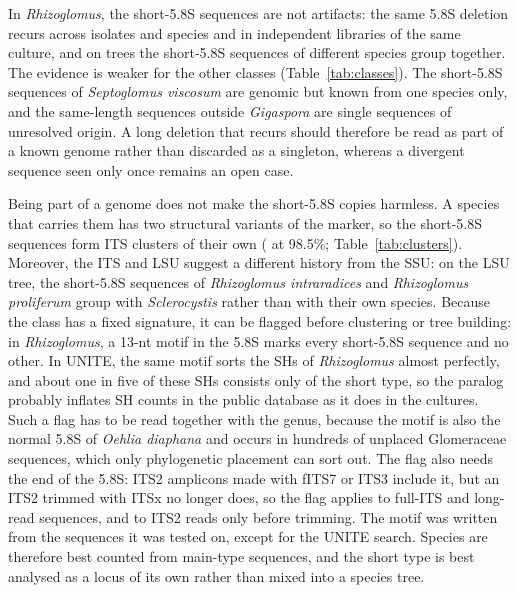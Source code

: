 \documentclass[11pt]{article}
\newcommand{\spn}[1]{\emph{#1}}   %
\begin{document}
In \spn{Rhizoglomus}, the short-5.8S sequences are not artifacts: the same 5.8S deletion recurs across isolates and
species and in independent libraries of the same culture, and on trees the short-5.8S sequences of different species
group together. The evidence is weaker for the other classes (Table~\ref{tab:classes}). The short-5.8S sequences of
\spn{Septoglomus viscosum} are genomic but known from one species only, and the same-length sequences outside
\spn{Gigaspora} are single sequences of unresolved origin. A long deletion that recurs should therefore be read as
part of a known genome rather than discarded as a singleton, whereas a divergent sequence seen only once remains an
open case.

Being part of a genome does not make the short-5.8S copies harmless. A species that carries them has two structural
variants of the marker, so the short-5.8S sequences form ITS clusters of their own (\ParITSNEShort{} at 98.5\%;
Table~\ref{tab:clusters}). Moreover, the ITS and LSU suggest a different history from the SSU: on the LSU tree, the
short-5.8S sequences of \spn{Rhizoglomus intraradices} and \spn{Rhizoglomus proliferum} group with \spn{Sclerocystis}
rather than with their own species. Because the class has a fixed signature, it can be flagged before clustering or
tree building: in \spn{Rhizoglomus}, a 13-nt motif in the 5.8S marks every short-5.8S sequence and no other. In UNITE,
the same motif sorts the SHs of \spn{Rhizoglomus} almost perfectly, and about one in five of these SHs consists only of
the short type, so the paralog probably inflates SH counts in the public database as it does in the cultures. Such a
flag has to be read together with the genus, because the motif is also the normal 5.8S of \spn{Oehlia diaphana} and
occurs in hundreds of unplaced Glomeraceae sequences, which only phylogenetic placement can sort out. The flag also
needs the end of the 5.8S: ITS2 amplicons made with fITS7 or ITS3 include it, but an ITS2 trimmed with ITSx no longer
does, so the flag applies to full-ITS and long-read sequences, and to ITS2 reads only before trimming. The motif was
written from the sequences it was tested on, except for the UNITE search. Species are therefore best counted from
main-type sequences, and the short type is best analysed as a locus of its own rather than mixed into a species tree.
\end{document}
